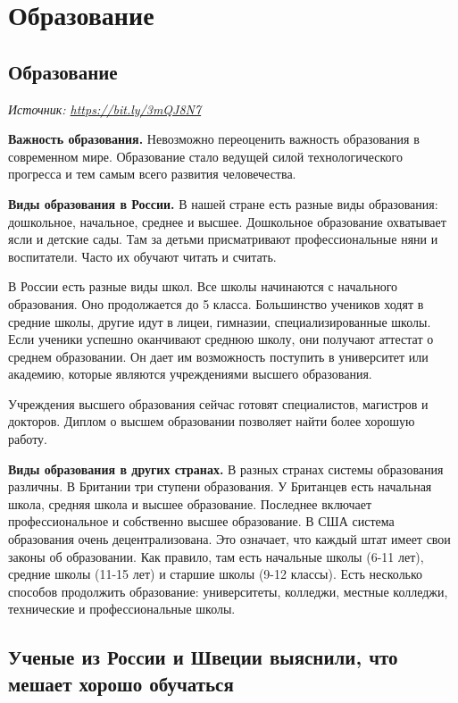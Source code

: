 \chapter{Образование}

\section{Образование}

\textit{Источник: \url{https://bit.ly/3mQJ8N7}}

\textbf{Важность образования.}
Невозможно переоценить важность образования в современном мире. Образование стало ведущей силой технологического прогресса и тем самым всего развития человечества.

\textbf{Виды образования в России.}
В нашей стране есть разные виды образования: дошкольное, начальное, среднее и высшее.
Дошкольное образование охватывает ясли и детские сады. Там за детьми присматривают профессиональные няни и воспитатели. Часто их обучают читать и считать.

В России есть разные виды школ. Все школы начинаются с начального образования. Оно продолжается до 5 класса. Большинство учеников ходят в средние школы, другие идут в лицеи, гимназии, специализированные школы. Если ученики успешно оканчивают среднюю школу, они получают аттестат о среднем образовании. Он дает им возможность поступить в университет или академию, которые являются учреждениями высшего образования.

Учреждения высшего образования сейчас готовят специалистов, магистров и докторов. Диплом о высшем образовании позволяет найти более хорошую работу.

\textbf{Виды образования в других странах.}
В разных странах системы образования различны. В Британии три ступени образования. У Британцев есть начальная школа, средняя школа и высшее образование. Последнее включает профессиональное и собственно высшее образование.
В США система образования очень децентрализована. Это означает, что каждый штат имеет свои законы об образовании. Как правило, там есть начальные школы (6-11 лет), средние школы (11-15 лет) и старшие школы (9-12 классы). Есть несколько способов продолжить образование: университеты, колледжи, местные колледжи, технические и профессиональные школы.


\section[Что мешает хорошо обучаться]{Ученые из России и Швеции выяснили, что мешает хорошо обучаться}


